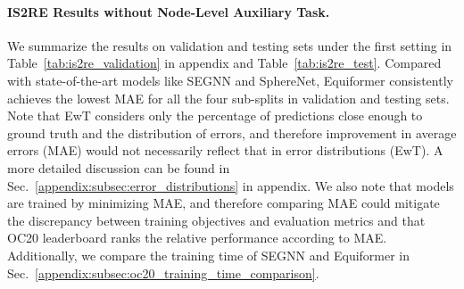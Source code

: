 \paragraph{IS2RE Results without Node-Level Auxiliary Task.}
We summarize the results on validation and testing sets under the first setting in Table~\ref{tab:is2re_validation} in appendix and Table~\ref{tab:is2re_test}.
Compared with state-of-the-art models like SEGNN and SphereNet, Equiformer consistently achieves the lowest MAE for all the four sub-splits in validation and testing sets.
Note that EwT considers only the percentage of predictions close enough to ground truth and the distribution of errors, and therefore improvement in average errors (MAE) would not necessarily reflect that in error distributions (EwT).
A more detailed discussion can be found in Sec.~\ref{appendix:subsec:error_distributions} in appendix.
We also note that models are trained by minimizing MAE, and therefore comparing MAE could mitigate the discrepancy between training objectives and evaluation metrics and that OC20 leaderboard ranks the relative performance according to MAE.
Additionally, we compare the training time of SEGNN and Equiformer in Sec.~\ref{appendix:subsec:oc20_training_time_comparison}.

\vspace{-3.5mm}
